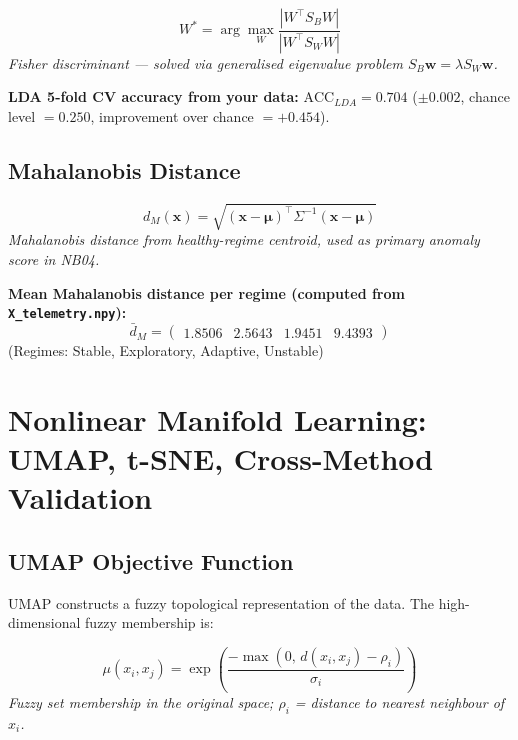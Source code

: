 \documentclass[12pt]{article}
\begin{document}
\begin{equation}
W^* = \arg\max_W \frac{|W^\top S_B W|}{|W^\top S_W W|}
\end{equation}
\noindent\textit{Fisher discriminant — solved via generalised eigenvalue problem $S_B \mathbf{w} = \lambda S_W \mathbf{w}$.}


\noindent\textbf{LDA 5-fold CV accuracy from your data:} $\mathrm{ACC}_{LDA} = 0.704$ ($\pm 0.002$, chance level $= 0.250$, improvement over chance $= +0.454$).



\subsection{Mahalanobis Distance}

\begin{equation}
d_M(\mathbf{x}) = \sqrt{(\mathbf{x} - \boldsymbol{\mu})^\top \Sigma^{-1}(\mathbf{x} - \boldsymbol{\mu})}
\end{equation}
\noindent\textit{Mahalanobis distance from healthy-regime centroid, used as primary anomaly score in NB04.}


\noindent\textbf{Mean Mahalanobis distance per regime (computed from \texttt{X\_telemetry.npy}):}
\begin{equation}
\bar{d}_M = \begin{pmatrix}1.8506 & 2.5643 & 1.9451 & 9.4393\end{pmatrix}
\end{equation}
(Regimes: Stable, Exploratory, Adaptive, Unstable)



\section{Nonlinear Manifold Learning: UMAP, t-SNE, Cross-Method Validation}


\subsection{UMAP Objective Function}

UMAP constructs a fuzzy topological representation of the data.
The high-dimensional fuzzy membership is:

\begin{equation}
\mu(x_i, x_j) = \exp\!\left(\frac{-\max(0,\,d(x_i,x_j)-\rho_i)}{\sigma_i}\right)
\end{equation}
\noindent\textit{Fuzzy set membership in the original space; $\rho_i$ = distance to nearest neighbour of $x_i$.}
\end{document}
